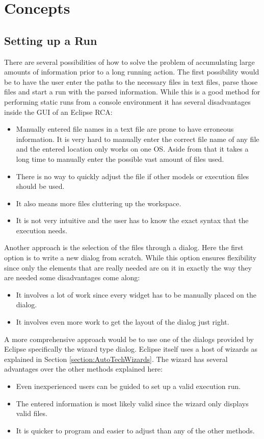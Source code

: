 \chapter{Concepts}
\label{chapter:AutoConcepts}

\section{Setting up a Run}
\label{section:AutoConceptsSetup}
There are several possibilities of how to solve the problem of accumulating
large amounts of information prior to a long running action.
The first possibility would be to have the user enter the paths to the 
necessary files in text files, parse those files and start a run with
the parsed information. While this is a good method for performing
static runs from a console environment it has several disadvantages
inside the \ac{GUI} of an Eclipse \ac{RCA}:
\begin{itemize}
 \item Manually entered file names in a text file are prone to have erroneous information.
It is very hard to manually enter the correct file name of any file and the entered location
only works on one \ac{OS}. Aside from that it takes a long time to manually enter the possible vast
amount of files used.
 \item There is no way to quickly adjust the file if other models or execution files should be used.
 \item It also means more files cluttering up the workspace.
 \item It is not very intuitive and the user has to know the exact syntax that the execution needs.
\end{itemize}

Another approach is the selection of the files through a dialog.
Here the first option is to write a new dialog from scratch. While this option
ensures flexibility since only the elements that are really needed are on it in
exactly the way they are needed some disadvantages come along:
\begin{itemize}
 \item It involves a lot of work since every widget has to be manually placed on the dialog.
 \item It involves even more work to get the layout of the dialog just right.
\end{itemize}

A more comprehensive approach would be to use one of the dialogs provided by Eclipse specifically the wizard type dialog.
Eclipse itself uses a host of wizards as explained in Section \ref{section:AutoTechWizards}.
The wizard has several advantages over the other methods explained here:
\begin{itemize}
 \item Even inexperienced users can be guided to set up a valid execution run.
 \item The entered information is most likely valid since the wizard only displays valid files.
 \item It is quicker to program and easier to adjust than any of the other methods.
\end{itemize}


